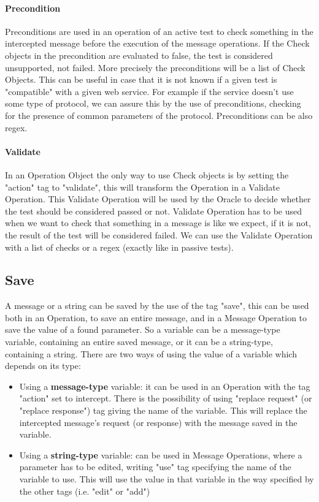 \paragraph{Precondition}
Preconditions are used in an operation of an active test to check something in the intercepted message before the execution of the message operations. If the Check objects in the precondition are evaluated to false, the test is considered unsupported, not failed. More precisely the preconditions will be a list of Check Objects. This can be useful in case that it is not known if a given test is "compatible" with a given web service. For example if the service doesn't use some type of protocol, we can assure this by the use of preconditions, checking for the presence of common parameters of the protocol. Preconditions can be also regex.
\paragraph{Validate}
In an Operation Object the only way to use Check objects is by setting the "action" tag to "validate", this will transform the Operation in a Validate Operation. This Validate Operation will be used by the Oracle to decide whether the test should be considered passed or not. Validate Operation has to be used when we want to check that something in a message is like we expect, if it is not, the result of the test will be considered failed.
We can use the Validate Operation with a list of checks or a regex (exactly like in passive tests).

\subsection{Save}
A message or a string can be saved by the use of the tag "save", this can be used both in an Operation, to save an entire message, and in a Message Operation to save the value of a found parameter. So a variable can be a message-type variable, containing an entire saved message, or it can be a string-type, containing a string.
There are two ways of using the value of a variable which depends on its type:
\begin{itemize}
    \item Using a \textbf{message-type} variable: it can be used in an Operation with the tag "action" set to intercept. There is the possibility of using "replace request" (or "replace response") tag giving the name of the variable. This will replace the intercepted message's request (or response) with the message saved in the variable.
    \item Using a \textbf{string-type} variable: can be used in Message Operations, where a parameter has to be edited, writing "use" tag specifying the name of the variable to use. This will use the value in that variable in the way specified by the other tags (i.e. "edit" or "add")
\end{itemize}

